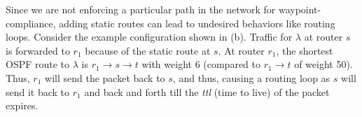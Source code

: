 			
 \label{sec:loopavoidance}
Since we are not enforcing a particular path in the network for waypoint-
compliance, adding
static routes can lead to undesired behaviors like routing loops.  
Consider the example configuration shown in (b). 
Traffic for $\lambda$ at router $s$ is forwarded to $r_1$ because of the
static route at $s$. At router $r_1$, the shortest OSPF route to
$\lambda$ is $r_1 \rightarrow s \rightarrow t$ with weight 6 (compared 
to $r_1 \rightarrow t$ of weight 50). Thus, $r_1$ will send the 
packet back to $s$, and thus, causing a routing loop as $s$ will send
it back to $r_1$ and back and forth till the \emph{ttl} (time to live) of the
packet expires. 

